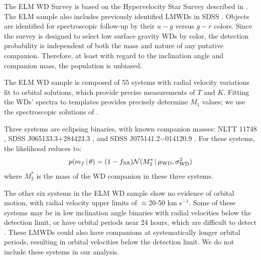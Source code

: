 \documentclass[apjl]{emulateapj}
\newcommand{\given}{\,|\,}
\newcommand{\Msun}{\ifmmode {{\rm M}_{\odot}}\else M$_{\odot}$\fi}
\newcommand{\period}{T}
\newcommand{\mf}{m_f}
\begin{document}
The ELM WD Survey is based on the Hypervelocity Star Survey described in \citet{brown06}. The ELM sample also includes previously identified LMWDs in SDSS \citep{eisenstein06,liebert04}. Objects are identified for spectroscopic follow-up by their $u-g$ versus $g-r$ colors. Since the survey is designed to select low surface gravity WDs by color, the detection probability is independent of both the mass and nature of any putative companion. Therefore, at least with regard to the inclination angle and companion mass, the population is unbiased.


The ELM WD sample is composed of 55 systems with radial velocity variations fit to orbital solutions, which provide precise measurements of $\period$ and $K$. Fitting the WDs' spectra to templates provides precisely determine $M_1$ values; we use the spectroscopic solutions of \citet{gianninas14}. 

Three systems are eclipsing binaries, with known companion masses: NLTT 11748 \citep[$M_2=0.72~\Msun$;][]{kaplan14}, SDSS J065133.3$+$284423.3 \citep[$M_2=0.50~\Msun$;][]{brown11b}, and SDSS J075141.2$-$014120.9 \citep[$M_2=0.97~\Msun$;][]{kilic14}. For these systems, the likelihood reduces to:
\begin{equation}
p(\mf \given \theta) = (1-f_{\rm NS}) \mathcal{N}(M_2^* \given \mu_{\rm WD}, \sigma^2_{\rm WD})
\end{equation}
where $M_2^*$ is the mass of the WD companion in these three systems. 


The other six systems in the ELM WD sample show no evidence of orbital motion, with radial velocity upper limits of $\approx$20-50 km s$^{-1}$. Some of these systems may be in low inclination angle binaries with radial velocities below the detection limit, or have orbital periods near 24 hours, which are difficult to detect \citep{ELMV}. These LMWDs could also have companions at systematically longer orbital periods, resulting in orbital velocities below the detection limit. We do not include these systems in our analysis.
\end{document}
